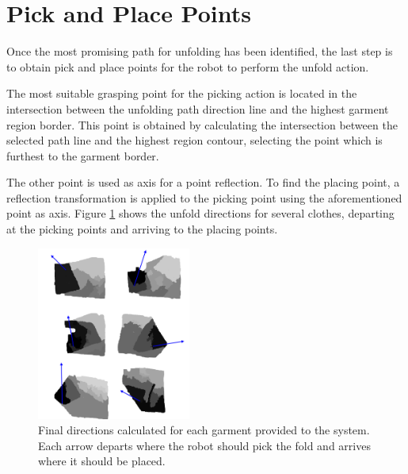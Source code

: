 \section{Pick and Place Points}
\label{pick_and_place}
Once the most promising path for unfolding has been identified, the last step is to obtain pick and place points for the robot to perform the unfold action.

The most suitable grasping point for the picking action is located in the  intersection between the unfolding path direction line and the highest garment region border. This point is obtained by calculating the intersection between the selected path line and the highest region contour, selecting the point which is furthest to the garment border.

The other point is used as axis for a point reflection. To find the placing point, a reflection transformation is applied to the picking point using the aforementioned point as axis. Figure \ref{fig:directions} shows the unfold directions for several clothes, departing at the picking points and arriving to the placing points.

\begin{figure}[thpb]
    \centering
    \includegraphics[width=0.45\textwidth]{figures/directions.pdf}
    \caption{Final directions calculated for each garment provided to the system. Each arrow departs where the robot should pick the fold and arrives where it should be placed.}
    \label{fig:directions}
\end{figure}